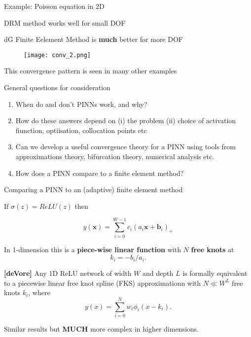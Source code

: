 \documentclass{beamer}
\begin{document}
\begin{frame} {Example: Poisson equation in 2D} 


{\color{blue} DRM method works well for small DOF}

{\color{purple} dG Finite Eelement Method is {\bf much} better for more DOF}


\begin{figure}
  \texttt{[image: conv\_2.png]}
 \end{figure}

{\color{red} This convergence pattern is seen in many other examples}

\end{frame}


\begin{frame}{General questions for consideration}
  


\vspace{0.1in}

\begin{enumerate}

\item When do and don't PINNs work, and why?
\item How do these answers depend on (i) the problem (ii) choice of activation fiunction, optiisation, collocation points etc
\item Can we develop a useful convergence theory for a PINN
using tools from approximations theory, bifurcation theory, numerical analysis etc.
\item How does a PINN compare to a finite element method?
\end{enumerate}
  
\end{frame}


\begin{frame}{Comparing a PINN to an (adaptive) finite element method}

If $\sigma(z) = ReLU(z)$  then

$$y({\mathbf x}) = \sum_{i=0}^{W-1} c_i (a_i {\mathbf x} + {\mathbf b}_i)_+$$

In 1-dimension this is a {\bf piece-wise linear function} with $N$ {\bf free knots} at 
$$k_i = -b_i/a_i.$$


{\color{blue} {\bf [deVore]} Any 1D ReLU network of width $W$ and depth $L$ is formally equivalent to a piecewise linear free knot spline (FKS) approximationn with $N \ll W^L$ free knots $k_i$, where 
$$y(x) = \sum_{i=0}^N w_i \phi_i(x - k_i).$$ }


\vspace{0.1in}

Similar results  but {\bf MUCH} more complex in higher dimensions. 


\end{frame}
\end{document}
